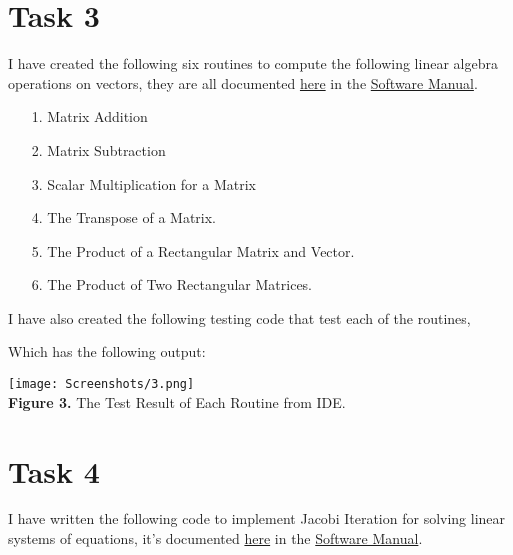 \documentclass{article}
\begin{document}
\section*{Task 3}
I have created the following six routines to compute the following linear algebra operations on vectors, they are all documented \href{https://github.com/GoByMark/math4610/blob/main/Homework_Tasks/Tasksheet_09/src/Task_3.py}{here} in the \href{https://github.com/GoByMark/math4610/blob/main/Homework_Tasks/Software_Manual/Software_Manual_toc.md}{Software Manual}.\\
\begin{enumerate}
\item[1.] Matrix Addition\\

\item[2.] Matrix Subtraction\\

\item[3.] Scalar Multiplication for a Matrix\\

\item[4.] The Transpose of a Matrix.\\

\item[5.] The Product of a Rectangular Matrix and Vector.\\

\item[6.] The Product of Two Rectangular Matrices.\\

\end{enumerate}
I have also created the following testing code that test each of the routines, 



Which has the following output:
\begin{center}
\texttt{[image: Screenshots/3.png]}\\
{\bf Figure 3.} The Test Result of Each Routine from IDE.
\end{center}

\section*{Task 4}
I have written the following code to implement Jacobi Iteration for solving linear systems of equations, it's documented \href{https://github.com/GoByMark/math4610/blob/main/Homework_Tasks/Tasksheet_09/src/Task_4.py}{here} in the \href{https://github.com/GoByMark/math4610/blob/main/Homework_Tasks/Software_Manual/Software_Manual_toc.md}{Software Manual}.\\
\end{document}
